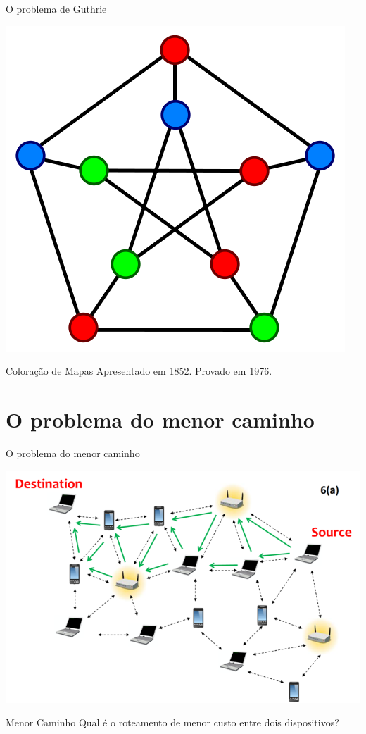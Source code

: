 \documentclass[xcolor=dvipsnames,table]{beamer}
\begin{document}
	\begin{frame}{O problema de Guthrie}
		\begin{center}
    		\includegraphics[height=.6\textheight]{images/grafoColorido2.png}
  		\end{center}
		\begin{block}{Coloração de Mapas} \pause
			Apresentado em 1852. Provado em 1976.
		\end{block}
	\end{frame}
	
	\section{O problema do menor caminho}
	\begin{frame}{O problema do menor caminho}
		\begin{center}
    		\includegraphics[height=.6\textheight]{images/redes.png}
  		\end{center}
		\begin{alertblock}{Menor Caminho} \pause
			Qual é o roteamento de menor custo entre dois dispositivos?
		\end{alertblock}
	\end{frame}
	
\end{document}
